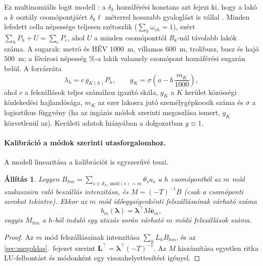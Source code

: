 \documentclass[12pt,a4paper]{article}
\newtheorem{allitas}[tetel]{Állítás}
\theoremstyle{definition}
\theoremstyle{remark}
\newcommand{\Ss}{\mathcal{S}}
\begin{document}
Ez multinomiális logit modell \citep{mcfadden1974}: a $\delta_k$
hozzáférési konstans azt fejezi ki, hogy a lakó a $k$ osztály csomópontjáért
$\delta_k\ell$ méterrel hosszabb gyaloglást is vállal \citep{debrezion2009}.
Minden lefedett cella népessége teljesen szétoszlik
($\sum_h\omega_{ch}=1$), ezért $\sum_hP_h+U=\sum_cP_c$, ahol $U$ a minden
csomóponttól $R_k$-nál távolabb lakók száma. A sugarak: metró és HÉV
$1000$~m, villamos $600$~m, trolibusz, busz és hajó $500$~m; a fővárosi
népesség \POPCOVER\%-a lakik valamely csomópont hozzáférési sugarán belül.
A forrásráta
\[
  \lambda_h=c\,g_{K(h)}P_h ,\qquad g_K=\sigma\!\left(a-b\,\frac{m_K}{1000}\right),
\]
ahol $c$ a felszállások teljes számához igazító skála, $g_K$ a $K$ kerület
közösségi közlekedési hajlandósága, $m_K$ az ezer lakosra jutó
személygépkocsik száma és $\sigma$ a logisztikus függvény (ha az ingázás
módok szerinti megoszlása ismert, $g_K$ közvetlenül az). Kerületi adatok
hiányában a dolgozatban $g\equiv1$.

\paragraph{Kalibráció a módok szerinti utasforgalomhoz.}
A modell linearitása a kalibrációt is egyszerűvé teszi.

\begin{allitas}
\label{all:modresp}
Legyen $B_{hm}=\sum_{s\in\Ss_h,\ \text{mód}(s)=m}\theta_sa_s$ a $h$
csomópontból az $m$ mód szakaszaira való beszállás intenzitása, és
$M=(-T)^{-1}B$ (csak a csomóponti sorokat tekintve). Ekkor az $m$ mód
időegységenkénti felszállásainak várható száma
\[
  b_m(\bm\lambda)=\bm\lambda^{\top}M\bm e_m ,
\]
vagyis $M_{hm}$ a $h$-ból induló egy utazás során várható $m$ módú
felszállások száma.
\end{allitas}

\begin{proof}
Az $m$ mód felszállásainak intenzitása $\sum_hL_hB_{hm}$, és az
\ref{sec:megoldas}.~fejezet szerint $\bm L^{\top}=\bm\lambda^{\top}(-T)^{-1}$.
Az $M$ kiszámítása egyetlen ritka LU-felbontást és módonként egy
visszahelyettesítést igényel.
\end{proof}
\end{document}
